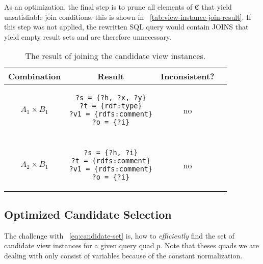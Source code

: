 \documentclass[a4paper,twoside,bibtotoc,abstracton,12pt,BCOR=15mm]{scrreprt}
\begin{document}
As an optimization, the final step is to prune all elements of $\mathfrak{C}$ that yield unsatisfiable join conditions, this is shown in
~\autoref{tab:view-instance-join-result}.
If this step was not applied, the rewritten SQL query would contain JOINS that yield empty result sets and are therefore unnecessary. 

\begin{table}
\centering
\begin{tabular}{cccc}
\toprule
\textbf{Combination} & \textbf{Result} & \textbf{Inconsistent?} \\
\midrule

$A_1 \times B_1$

&

\begin{minipage}{3cm}
\begin{scriptsize}
\begin{verbatim}
?s = {?h, ?x, ?y}
?t = {rdf:type}
?v1 = {rdfs:comment}
?o = {?i}
\end{verbatim}
\end{scriptsize}
\end{minipage}


&

no

\\

\\
 
$A_2 \times B_1$

&

\begin{minipage}{3cm}
\begin{scriptsize}
\begin{verbatim}
?s = {?h, ?i}
?t = {rdfs:comment}
?v1 = {rdfs:comment}
?o = {?i}
\end{verbatim}
\end{scriptsize}
\end{minipage}

&

no

\\
\bottomrule
\end{tabular}
\caption{The result of joining the candidate view instances.}
\label{tab:view-instance-join-result}
\end{table}



\subsection{Optimized Candidate Selection}
\label{sec:optimized-candidate-selection}
The challenge with ~\autoref{eq:candidate-set} is, how to \emph{efficiently} find the set of candidate view instances for a given query quad $p$.
Note that theses quads we are dealing with only consist of variables because of the constant normalization.
\end{document}
